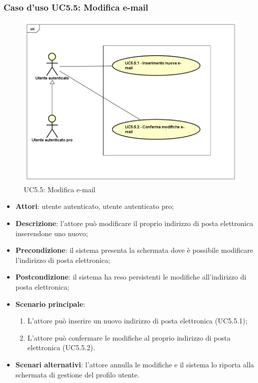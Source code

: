 \subsubsection{Caso d'uso UC5.5: Modifica e-mail}
\label{UC5.5}
\begin{figure}[h]
	\centering
	\includegraphics[scale=0.5,keepaspectratio]{UML/UC5_5.png}
	\caption{UC5.5: Modifica e-mail}
\end{figure}

\begin{itemize}
	\item \textbf{Attori}: utente autenticato, utente autenticato pro;
	\item \textbf{Descrizione}: l'attore può modificare il proprio indirizzo di posta elettronica inserendone uno nuovo;
	\item \textbf{Precondizione}: il sistema presenta la schermata dove è possibile modificare l'indirizzo di posta elettronica;
	\item \textbf{Postcondizione}: il sistema ha reso persistenti le modifiche all'indirizzo di posta elettronica;
	\item \textbf{Scenario principale}:
		\begin{enumerate}
			\item L'attore può inserire un nuovo indirizzo di posta elettronica (UC5.5.1);
			\item L'attore può confermare le modifiche al proprio indirizzo di posta elettronica (UC5.5.2).
		\end{enumerate}
	\item \textbf{Scenari alternativi}: l'attore annulla le modifiche e il sistema lo riporta alla schermata di gestione del profilo utente.
\end{itemize}

